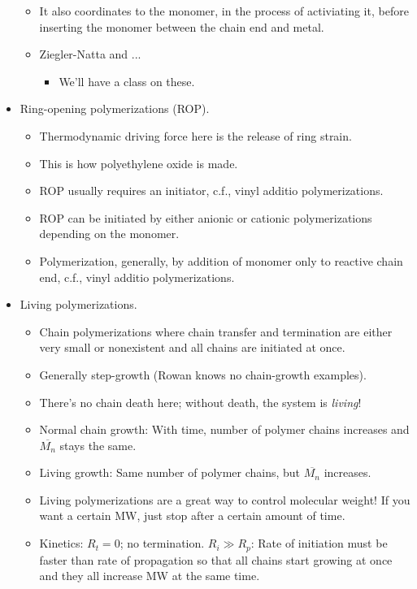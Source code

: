 \documentclass[../notes.tex]{subfiles}
\begin{document}
\begin{itemize}
\begin{itemize}
        \item It also coordinates to the monomer, in the process of activiating it, before inserting the monomer between the chain end and metal.
        \item Ziegler-Natta and ...
        \begin{itemize}
            \item We'll have a class on these.
        \end{itemize}
    \end{itemize}
    \item Ring-opening polymerizations (ROP).
    \begin{itemize}
        \item Thermodynamic driving force here is the release of ring strain.
        \item This is how polyethylene oxide is made.
        \item ROP usually requires an initiator, c.f., vinyl additio polymerizations.
        \item ROP can be initiated by either anionic or cationic polymerizations depending on the monomer.
        \item Polymerization, generally, by addition of monomer only to reactive chain end, c.f., vinyl additio polymerizations.
    \end{itemize}
    \item Living polymerizations.
    \begin{itemize}
        \item Chain polymerizations where chain transfer and termination are either very small or nonexistent and all chains are initiated at once.
        \item Generally step-growth (Rowan knows no chain-growth examples).
        \item There's no chain death here; without death, the system is \emph{living}!
        \item Normal chain growth: With time, number of polymer chains increases and $\overline{M_n}$ stays the same.
        \item Living growth: Same number of polymer chains, but $\overline{M_n}$ increases.
        \item Living polymerizations are a great way to control molecular weight! If you want a certain MW, just stop after a certain amount of time.
        \item Kinetics: $R_t=0$; no termination. $R_i\gg R_p$: Rate of initiation must be faster than rate of propagation so that all chains start growing at once and they all increase MW at the same time.

\end{itemize}
\end{itemize}
\end{document}
